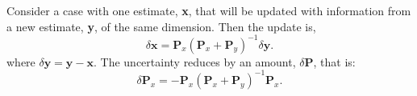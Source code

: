 \documentclass{article}
\begin{document}
Consider a case with one estimate, \textbf{x}, that will be updated with information from a new estimate, \textbf{y}, of the same dimension.
Then the update is,
\begin{equation}
\label{eq:15}
\delta\mathbf{x} = \mathbf{P}_x (\mathbf{P}_x + \mathbf{P}_y )^{-1} \delta\mathbf{y} .
\end{equation}
where $\delta \mathbf{y} = \mathbf{y} - \mathbf{x}$.
The uncertainty reduces by an amount, $\delta\mathbf{P}$, that is:
\begin{equation}
\label{eq:16}
\delta\mathbf{P}_{x} = - \mathbf{P}_x (\mathbf{P}_x + \mathbf{P}_y )^{-1} \mathbf{P}_x.
\end{equation}
\end{document}
